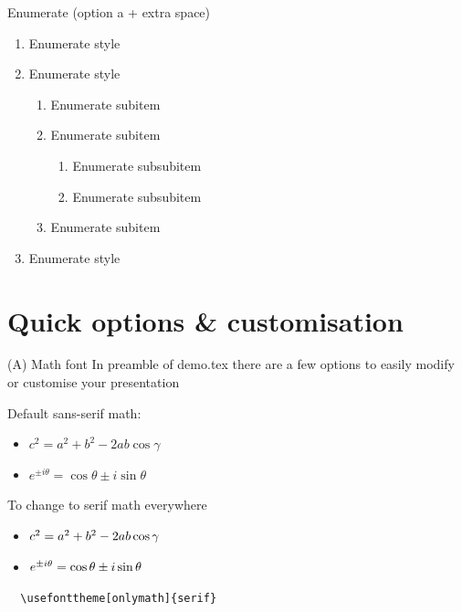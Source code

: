 \documentclass[10pt,t]{beamer}
\begin{document}
\begin{frame}{Enumerate}
(option a + extra space)
\begin{enumerate}[a\enspace]
	\item Enumerate style
	\item Enumerate style
	\begin{enumerate}[a\enspace]
		\item Enumerate subitem
		\item Enumerate subitem
		\begin{enumerate}[a\enspace]
			\item Enumerate subsubitem
			\item Enumerate subsubitem
		\end{enumerate}
		\item Enumerate subitem
	\end{enumerate}
	\item Enumerate style
\end{enumerate}
\end{frame}







\section{Quick options \& customisation}

\begin{frame}[fragile]{(A) Math font}
In preamble of demo.tex there are a few options to easily modify or customise your presentation 

\medskip
Default sans-serif math:
    \begin{itemize}
        \item $ c^2 = a^2+b^2 - 2ab \cos\gamma $
        \item $e^{ \pm i\theta } = \cos \theta \pm i\sin \theta$
    \end{itemize}

\medskip
To change to serif math everywhere

    \begin{itemize}
        \item $ \mathnormal{c^\mathrm{2} = a^\mathrm{2}+b^\mathrm{2} - \mathrm{2}ab \cos\gamma} $
        \item $\mathnormal{e^{ \pm i\theta } = \cos \theta \pm i\sin \theta}$
    \end{itemize}
\medskip
\verb+  \usefonttheme[onlymath]{serif}+

\end{frame}
\end{document}
